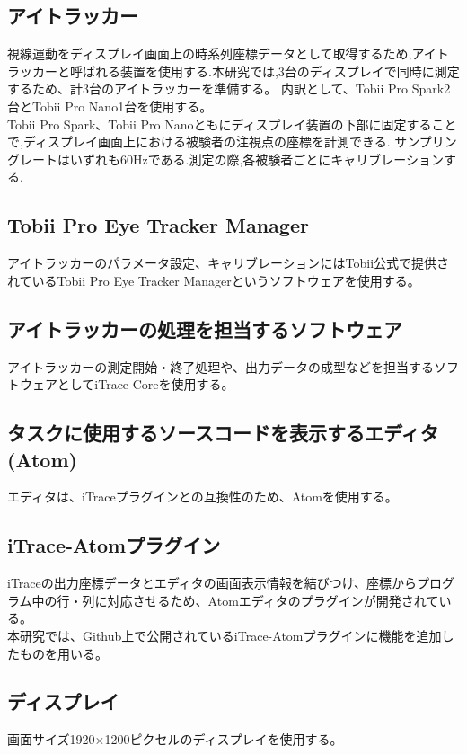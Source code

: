 \documentclass[paper=a4paper,fontsize=11pt]{jlreq}
\begin{document}
    \subsection{アイトラッカー}
      視線運動をディスプレイ画面上の時系列座標データとして取得するため,アイトラッカーと呼ばれる装置を使用する.本研究では,3台のディスプレイで同時に測定するため、計3台のアイトラッカーを準備する。
      内訳として、Tobii Pro Spark\cite{spark}2台とTobii Pro Nano\cite{nano}1台を使用する。
      \\
      Tobii Pro Spark、Tobii Pro Nanoともにディスプレイ装置の下部に固定することで,ディスプレイ画面上における被験者の注視点の座標を計測できる.
      サンプリングレートはいずれも60Hzである.測定の際,各被験者ごとにキャリブレーションする.

    \subsection{Tobii Pro Eye Tracker Manager}
      アイトラッカーのパラメータ設定、キャリブレーションにはTobii公式で提供されているTobii Pro Eye Tracker Managerというソフトウェアを使用する。
    
    \subsection{アイトラッカーの処理を担当するソフトウェア}
      アイトラッカーの測定開始・終了処理や、出力データの成型などを担当するソフトウェアとしてiTrace Core\cite{itrace}を使用する。

    \subsection{タスクに使用するソースコードを表示するエディタ(Atom)}
      エディタは、iTraceプラグインとの互換性のため、Atom\cite{atom}を使用する。

    \subsection{iTrace-Atomプラグイン}
      iTraceの出力座標データとエディタの画面表示情報を結びつけ、座標からプログラム中の行・列に対応させるため、Atomエディタのプラグインが開発されている。\\
      本研究では、Github上で公開されているiTrace-Atomプラグインに機能を追加したものを用いる。
    
      
    \subsection{ディスプレイ}
      画面サイズ1920×1200ピクセルのディスプレイを使用する。
\end{document}
